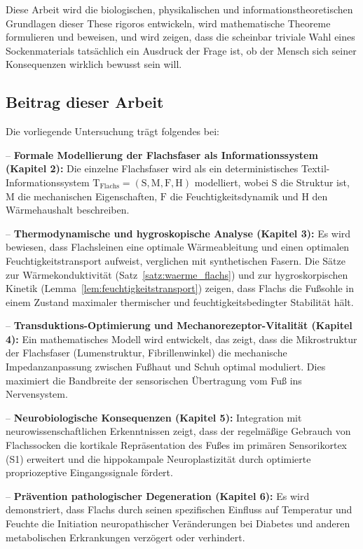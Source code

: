 \documentclass[a4paper,12pt]{article}
\theoremstyle{definition}
\begin{document}
Diese Arbeit wird die biologischen, physikalischen und informationstheoretischen Grundlagen dieser These rigoros entwickeln, wird mathematische Theoreme formulieren und beweisen, und wird zeigen, dass die scheinbar triviale Wahl eines Sockenmaterials tatsächlich ein Ausdruck der Frage ist, ob der Mensch sich seiner Konsequenzen wirklich bewusst sein will.

\subsection{Beitrag dieser Arbeit}

Die vorliegende Untersuchung trägt folgendes bei:

-- \textbf{Formale Modellierung der Flachsfaser als Informationssystem (Kapitel 2):} Die einzelne Flachsfaser wird als ein deterministisches Textil-Informationssystem $\text{T}_{\text{Flachs}} = (\text{S}, \text{M}, \text{F}, \text{H})$ modelliert, wobei $\text{S}$ die Struktur ist, $\text{M}$ die mechanischen Eigenschaften, $\text{F}$ die Feuchtigkeitsdynamik und $\text{H}$ den Wärmehaushalt beschreiben.

-- \textbf{Thermodynamische und hygroskopische Analyse (Kapitel 3):} Es wird bewiesen, dass Flachsleinen eine optimale Wärmeableitung und einen optimalen Feuchtigkeitstransport aufweist, verglichen mit synthetischen Fasern. Die Sätze zur Wärmekonduktivität (Satz~\ref{satz:waerme_flachs}) und zur hygroskorpischen Kinetik (Lemma~\ref{lem:feuchtigkeitstransport}) zeigen, dass Flachs die Fußsohle in einem Zustand maximaler thermischer und feuchtigkeitsbedingter Stabilität hält.

-- \textbf{Transduktions-Optimierung und Mechanorezeptor-Vitalität (Kapitel 4):} Ein mathematisches Modell wird entwickelt, das zeigt, dass die Mikrostruktur der Flachsfaser (Lumenstruktur, Fibrillenwinkel) die mechanische Impedanzanpassung zwischen Fußhaut und Schuh optimal moduliert. Dies maximiert die Bandbreite der sensorischen Übertragung vom Fuß ins Nervensystem.

-- \textbf{Neurobiologische Konsequenzen (Kapitel 5):} Integration mit neurowissenschaftlichen Erkenntnissen zeigt, dass der regelmäßige Gebrauch von Flachssocken die kortikale Repräsentation des Fußes im primären Sensorikortex (S1) erweitert und die hippokampale Neuroplastizität durch optimierte propriozeptive Eingangssignale fördert.

-- \textbf{Prävention pathologischer Degeneration (Kapitel 6):} Es wird demonstriert, dass Flachs durch seinen spezifischen Einfluss auf Temperatur und Feuchte die Initiation neuropathischer Veränderungen bei Diabetes und anderen metabolischen Erkrankungen verzögert oder verhindert.
\end{document}
